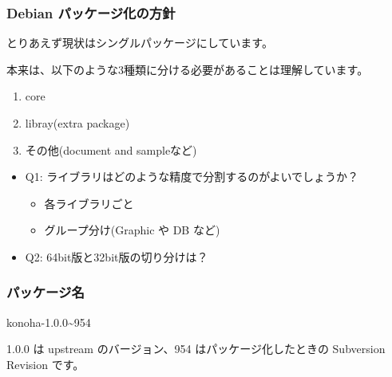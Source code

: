 \documentclass[mingoth,a4paper]{jsarticle}
\begin{document}
\subsubsection{Debian パッケージ化の方針}
とりあえず現状はシングルパッケージにしています。

本来は、以下のような3種類に分ける必要があることは理解しています。

\begin{enumerate}
\item core
\item libray(extra package)
\item その他(document and sampleなど)
\end{enumerate}

\begin{itemize}
\item Q1: ライブラリはどのような精度で分割するのがよいでしょうか？
  \begin{itemize}
  \item 各ライブラリごと
  \item グループ分け(Graphic や DB など)
  \end{itemize}
\item Q2: 64bit版と32bit版の切り分けは？
\end{itemize}

\subsubsection{パッケージ名}
\begin{screen}
  konoha-1.0.0\~{}954
\end{screen}

1.0.0 は upstream のバージョン、954 はパッケージ化したときの
Subversion Revision です。
\end{document}
